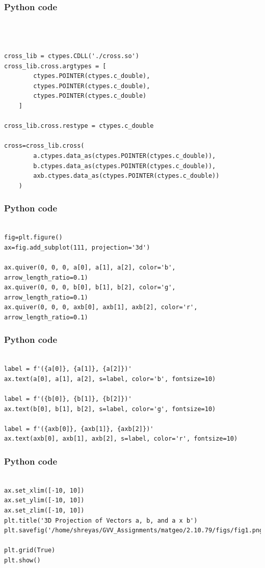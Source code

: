 \documentclass{beamer}
\begin{document}
\begin{frame}[fragile]
\frametitle{Python code}
\begin{lstlisting}



cross_lib = ctypes.CDLL('./cross.so')
cross_lib.cross.argtypes = [
        ctypes.POINTER(ctypes.c_double),
        ctypes.POINTER(ctypes.c_double),
        ctypes.POINTER(ctypes.c_double)
    ]

cross_lib.cross.restype = ctypes.c_double

cross=cross_lib.cross(
        a.ctypes.data_as(ctypes.POINTER(ctypes.c_double)),
        b.ctypes.data_as(ctypes.POINTER(ctypes.c_double)),
        axb.ctypes.data_as(ctypes.POINTER(ctypes.c_double))
    )
\end{lstlisting}
\end{frame}

\begin{frame}[fragile]
\frametitle{Python code}
\begin{lstlisting}

fig=plt.figure()
ax=fig.add_subplot(111, projection='3d')

ax.quiver(0, 0, 0, a[0], a[1], a[2], color='b', arrow_length_ratio=0.1)
ax.quiver(0, 0, 0, b[0], b[1], b[2], color='g', arrow_length_ratio=0.1)
ax.quiver(0, 0, 0, axb[0], axb[1], axb[2], color='r', arrow_length_ratio=0.1)

\end{lstlisting}
\end{frame}

\begin{frame}[fragile]
\frametitle{Python code}
\begin{lstlisting}

label = f'({a[0]}, {a[1]}, {a[2]})'
ax.text(a[0], a[1], a[2], s=label, color='b', fontsize=10)

label = f'({b[0]}, {b[1]}, {b[2]})'
ax.text(b[0], b[1], b[2], s=label, color='g', fontsize=10)

label = f'({axb[0]}, {axb[1]}, {axb[2]})'
ax.text(axb[0], axb[1], axb[2], s=label, color='r', fontsize=10)
\end{lstlisting}
\end{frame}

\begin{frame}[fragile]
\frametitle{Python code}
\begin{lstlisting}

ax.set_xlim([-10, 10])
ax.set_ylim([-10, 10])
ax.set_zlim([-10, 10])
plt.title('3D Projection of Vectors a, b, and a x b')
plt.savefig('/home/shreyas/GVV_Assignments/matgeo/2.10.79/figs/fig1.png')

plt.grid(True)
plt.show()
\end{lstlisting}
\end{frame}
\end{document}
